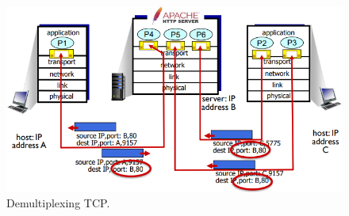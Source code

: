 \begin{figure}[h]
    \centering
    \includegraphics[scale=0.48]{Immagini/DemultiplexingTCP.png}
    \caption{Demultiplexing TCP.}
\end{figure}

